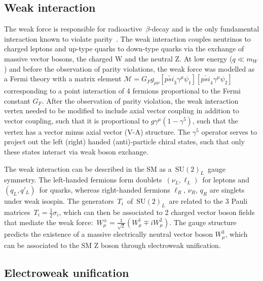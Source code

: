 \subsection{Weak interaction}
The weak force is responsible for radioactive~$\beta$-decay and is the only fundamental interaction known to violate parity~\cite{Wu:1957my}. The weak interaction couples neutrinos to charged leptons and up-type quarks to down-type quarks via the exchange of massive vector bosons, the charged W and the neutral Z. At low energy ($q \ll m_W$) and before the observation of parity violations, the weak force was modelled as a Fermi theory with a matrix element $\mathcal{M} = G_F g_{\mu\nu} [\bar{psi}_3 \gamma^\mu \psi_1][\bar{psi}_4 \gamma^\mu \psi_2]$ corresponding to a point interaction of 4 fermions proportional to the Fermi constant $G_F$. After the observation of parity violation, the weak interaction vertex needed to be modified to include axial vector coupling in addition to vector coupling, such that it is proportional to $g \gamma^\mu(1 - \gamma^5)$, such that the vertex has a vector minus axial vector (V-A) structure. The $\gamma^5$ operator serves to project out the left (right) handed (anti)-particle chiral states, such that only these states interact via weak boson exchange.

The weak interaction can be described in the SM as a~$\mathrm{SU}(2)_L$~gauge symmetry. The left-handed fermions form doublets~$(\nu_L, \mathrm{\ell}_L)$~for leptons and~$(q_L, q'_L)$~for quarks, whereas right-handed fermions $\ell_R$, $\nu_R$, $q_R$ are singlets under weak isospin. The generators~$T_i$~of~$\mathrm{SU}(2)_L$~are related to the 3 Pauli matrices~$T_i = \frac{1}{2}\sigma_i$, which can then be associated to 2 charged vector boson fields that mediate the weak force:~$W^{\pm}_\mu=\frac{1}{\sqrt{2}}(W^1_\mu \mp i W^2_\mu)$. The gauge structure predicts the existence of a massive electrically neutral vector boson $W^3_\mu$, which can be associated to the SM Z boson through electroweak unification.

\subsection{Electroweak unification}

